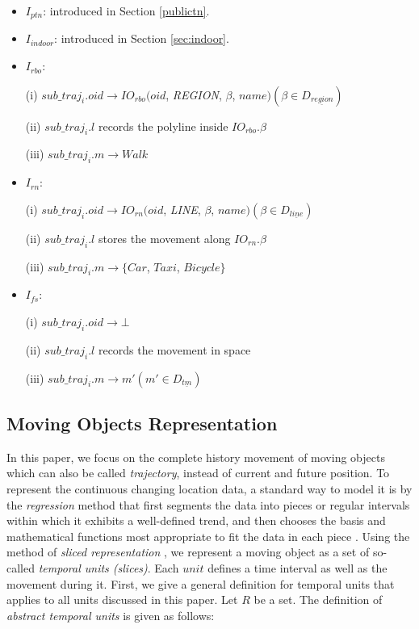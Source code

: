 \begin{itemize}
 \item $I_{ptn}$: introduced in Section \ref{publictn}. 

 \item $I_{indoor}$: introduced in Section \ref{sec:indoor}. 

 \item $I_{rbo}$: 

  (i) $sub\_traj_i.oid \rightarrow IO_{rbo}(oid$, \textit{REGION}, $\beta$, $name)(\beta \in D_{\underline{region}})$ 

  (ii) $sub\_traj_i.l$ records the polyline inside $IO_{rbo}.\beta$

  (iii) $sub\_traj_i.m \rightarrow Walk$ 

 \item $I_{rn}$:  

 (i) $sub\_traj_i.oid \rightarrow IO_{rn}(oid$, \textit{LINE}, $\beta$, $name)(\beta \in D_{\underline{line}})$

 (ii) $sub\_traj_i.l$ stores the movement along $IO_{rn}.\beta$ 

 (iii) $sub\_traj_i.m \rightarrow \{Car$, $Taxi$, $Bicycle\}$ 

 \item $I_{fs}$:

  (i) $sub\_traj_i.oid \rightarrow \bot$

  (ii) $sub\_traj_i.l$ records the movement in space

  (iii) $sub\_traj_i.m \rightarrow m' (m'\in D_{\underline{tm}})$
\end{itemize}

\subsection{Moving Objects Representation}
\label{sec:trajectoryrepresentation}
In this paper, we focus on the complete history movement of 
moving objects which can also be called \textit{trajectory}, instead of current and future position. 
To represent the continuous changing location data, a standard way to model it is by the
\textit{regression} method that first segments the data into pieces or regular intervals within 
which it exhibits a well-defined trend, and then chooses the basis and mathematical functions 
most appropriate to fit the data in each piece \cite{FG+00,GRS00,TM08}. 
Using the method of \textit{sliced representation} \cite{FG+00,LFGS03}, we represent 
a moving object as a set of so-called \textit{temporal units (slices)}. 
Each $unit$ defines a time interval as well as the movement during it. First, we give
a general definition for temporal units that applies to all units discussed in this paper.
Let $R$ be a set. The definition of \textit{abstract temporal units} is given as follows: 

